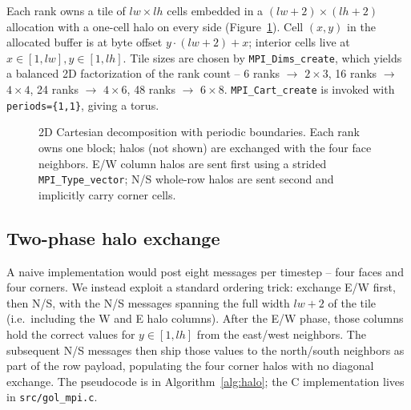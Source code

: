\documentclass[sigconf,nonacm,10pt]{acmart}
\begin{document}
Each rank owns a tile of $\mathit{lw}\times \mathit{lh}$ cells embedded
in a $(\mathit{lw}+2)\times(\mathit{lh}+2)$ allocation with a one-cell
halo on every side (Figure~\ref{fig:decomp}). Cell $(x,y)$ in the
allocated buffer is at byte offset $y\cdot(\mathit{lw}+2) + x$; interior
cells live at $x\in[1,\mathit{lw}], y\in[1,\mathit{lh}]$. Tile sizes
are chosen by \texttt{MPI\_Dims\_create}, which yields a balanced 2D
factorization of the rank count -- 6 ranks $\to$ $2\times 3$, 16 ranks
$\to$ $4\times 4$, 24 ranks $\to$ $4\times 6$, 48 ranks $\to$
$6\times 8$. \texttt{MPI\_Cart\_create} is invoked with
\texttt{periods=\{1,1\}}, giving a torus.

\begin{figure}[t]
\centering
{}
\caption{2D Cartesian decomposition with periodic boundaries. Each
rank owns one block; halos (not shown) are exchanged with the four
face neighbors. E/W column halos are sent first using a strided
\texttt{MPI\_Type\_vector}; N/S whole-row halos are sent second and
implicitly carry corner cells.}
\label{fig:decomp}
\end{figure}

\subsection{Two-phase halo exchange}

A naive implementation would post eight messages per timestep -- four
faces and four corners. We instead exploit a standard ordering trick:
exchange E/W first, then N/S, with the N/S messages spanning the full
width $\mathit{lw}+2$ of the tile (i.e.\ including the W and E halo
columns). After the E/W phase, those columns hold the correct values
for $y\in[1,\mathit{lh}]$ from the east/west neighbors. The
subsequent N/S messages then ship those values to the north/south
neighbors as part of the row payload, populating the four corner
halos with no diagonal exchange. The pseudocode is in
Algorithm~\ref{alg:halo}; the C implementation lives in
\texttt{src/gol\_mpi.c}.
\end{document}
